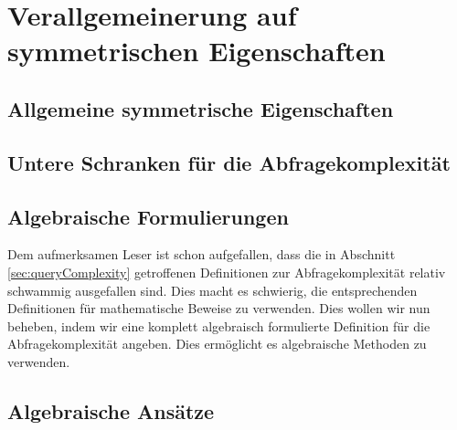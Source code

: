 \documentclass[a4paper]{scrreprt}
\theoremstyle{definition}
\begin{document}

\chapter{Verallgemeinerung auf symmetrischen Eigenschaften}

\section{Allgemeine symmetrische Eigenschaften}

\section{Untere Schranken für die Abfragekomplexität}

\section{Algebraische Formulierungen}
Dem aufmerksamen Leser ist schon aufgefallen, dass die in 
Abschnitt \ref{sec:queryComplexity} getroffenen Definitionen
zur Abfragekomplexität relativ schwammig ausgefallen sind.
Dies macht es schwierig, die entsprechenden Definitionen
für mathematische Beweise zu verwenden.
Dies wollen wir nun beheben, indem wir eine komplett algebraisch
formulierte Definition für die Abfragekomplexität angeben.
Dies ermöglicht es algebraische Methoden zu verwenden.


\section{Algebraische Ansätze}


\printbibliography
\end{document}
